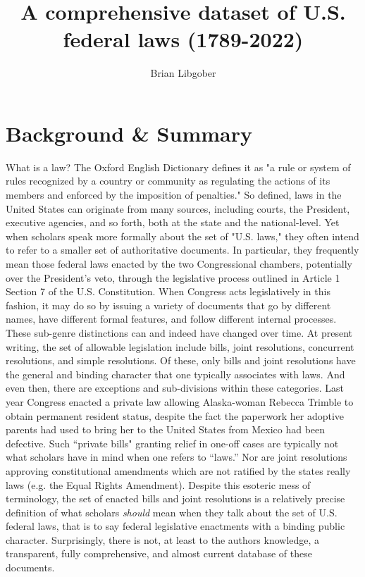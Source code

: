 \documentclass[fleqn,10pt]{wlscirep}
\title{A comprehensive dataset of U.S. federal laws (1789-2022)}
\author[$\dag$]{Brian Libgober}
\affil[$\dag$]{Northwestern University, Department of Political Science and School of Law, Evanston, IL, 60202, USA. brian.libgober@northwestern.edu}
\begin{document}
\flushbottom
\maketitle

\thispagestyle{empty}

\section*{Background \& Summary}
What is a law? The Oxford English Dictionary defines it as "a rule or system of rules recognized by a country or community as regulating the actions of its members and enforced by the imposition of penalties." \cite{law2008} So defined, laws in the United States can originate from many sources, including courts, the President, executive agencies, and so forth, both at the state and the national-level. Yet when scholars speak more formally about the set of "U.S. laws," they often intend to refer to a smaller set of authoritative documents. In particular, they frequently mean those federal laws enacted by the two Congressional chambers, potentially over the President's veto, through the legislative process outlined in Article 1 Section 7 of the U.S. Constitution. When Congress acts legislatively in this fashion, it may do so by issuing a variety of documents that go by different names, have different formal features, and follow different internal processes. These sub-genre distinctions can and indeed have changed over time. At present writing, the set of allowable legislation include bills, joint resolutions, concurrent resolutions, and simple resolutions. Of these, only bills and joint resolutions have the general and binding character that one typically associates with laws. And even then, there are exceptions and sub-divisions within these categories. Last year Congress enacted a private law allowing Alaska-woman Rebecca Trimble to obtain permanent resident status, despite the fact the paperwork her adoptive parents had used to bring her to the United States from Mexico had been defective. Such ``private bills" granting relief in one-off cases are typically not what scholars have in mind when one refers to ``laws.'' Nor are joint resolutions approving constitutional amendments which are not ratified by the states really laws (e.g. the Equal Rights Amendment). Despite this esoteric mess of terminology, the set of enacted bills and joint resolutions is a relatively precise definition of what scholars \textit{should} mean when they talk about the set of U.S. federal laws, that is to say federal legislative enactments with a binding public character. Surprisingly, there is not, at least to the authors knowledge, a transparent, fully comprehensive, and almost current database of these documents.
\end{document}
